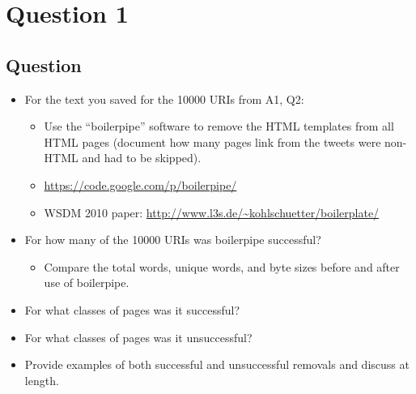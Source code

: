 \chapter{Question 1}
\label{question-1}
\section{Question}

\begin{itemize}
\item For the text you saved for the 10000 URIs from A1, Q2:
	\begin{itemize}
	\item Use the “boilerpipe” software to remove the HTML templates from all HTML pages (document how many pages link from the tweets were non-HTML and had to be skipped).
	\item \url{https://code.google.com/p/boilerpipe/}
	\item WSDM 2010 paper: \url{http://www.l3s.de/~kohlschuetter/boilerplate/}
	\end{itemize}
\item For how many of the 10000 URIs was boilerpipe successful?
	\begin{itemize}
	\item Compare the total words, unique words, and byte sizes before and after use of boilerpipe.
	\end{itemize}
\item For what classes of pages was it successful?
\item For what classes of pages was it unsuccessful?
\item Provide examples of both successful and unsuccessful removals and discuss at length.
\end{itemize}


